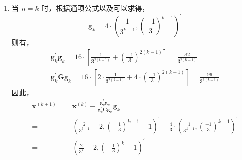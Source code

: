\documentclass[cn,mtpro2,12pt]{elegantbook}
\begin{document}
\begin{solution}
\begin{enumerate}
        \item 当 $n=k$ 时，根据通项公式以及可以求得，
              \begin{equation}
                  \mathbf{g}_{k}=4\cdot\left(\frac{1}{3^{k-1}},\left(\frac{-1}{3}\right)^{k-1}\right)^{\prime}
              \end{equation}
              则有，
              \begin{gather*}
                  \mathbf{g}_{k}^{\prime}\mathbf{g}_{k}=16\cdot\left[\frac{1}{3^{2(k-1)}}+\left(\frac{-1}{3}\right)^{2(k-1)}\right]=\frac{32}{3^{2(k-1)}}\\
                  \mathbf{g}_{k}^{\prime}\mathbf{G}\mathbf{g}_{k}=16\cdot\left[2\cdot\frac{1}{3^{2(k-1)}}+4\cdot\left(\frac{-1}{3}\right)^{2(k-1)}\right]=\frac{96}{3^{2(k-1)}}
              \end{gather*}
              因此，
              \begin{equation}
                  \begin{aligned}
                      \mathbf{x}^{(k+1)}= & \mathbf{x}^{(k)}-\frac{\mathbf{g}_{k}^{\prime}\mathbf{g}_{k}}{\mathbf{g}_{k}^{\prime}\mathbf{G}\mathbf{g}_{k}}\mathbf{g}_{k}                                        \\
                      =                   & \left(\frac{2}{3^{k-1}}-2,\left(-\frac{1}{3}\right)^{k-1}-1\right)^{\prime}-\frac{4}{3}\cdot\left(\frac{1}{3^{k-1}},\left(\frac{-1}{3}\right)^{k-1}\right)^{\prime} \\
                      =                   & \left(\frac{2}{3^{k}}-2,\left(-\frac{1}{3}\right)^{k}-1\right)^{\prime}
                  \end{aligned}
              \end{equation}
    \end{enumerate}
\end{solution}
\end{document}
